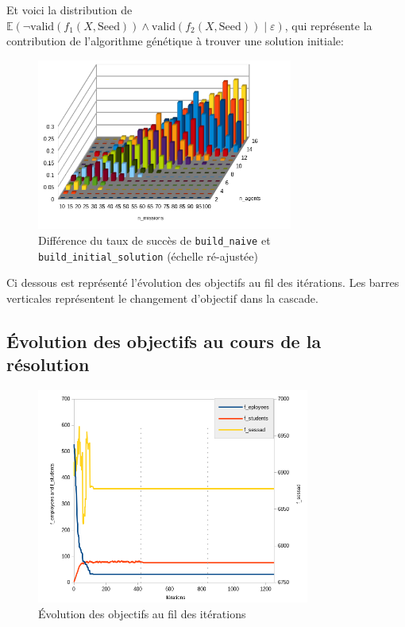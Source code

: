 \documentclass[11pt]{article}
\begin{document}
Et voici la distribution de $\mathbb{E}(\neg \text{valid}(f_1(X, \text{Seed})) \land \text{valid}(f_2(X, \text{Seed})) \;\vert\; \varepsilon)$, qui représente la contribution de l'algorithme génétique à trouver une solution initiale:

\begin{figure}[H]
    \centering
    \includegraphics[width=0.75\textwidth]{Images/initial-diff.png}
    \caption{Différence du taux de succès de \texttt{build\_naive} et \texttt{build\_initial\_solution} (échelle ré-ajustée)}
    \label{fig:diff_success}
\end{figure}


Ci dessous est représenté l'évolution des objectifs au fil des itérations. Les barres verticales représentent le changement d'objectif dans la cascade.


\subsection{Évolution des objectifs au cours de la résolution}

\begin{figure}[H]
    \centering
    \includegraphics[width=0.8\textwidth]{Images/score_evolution_graph.png}
    \caption{Évolution des objectifs au fil des itérations}
    \label{fig:score_evolution}
\end{figure}
\end{document}
